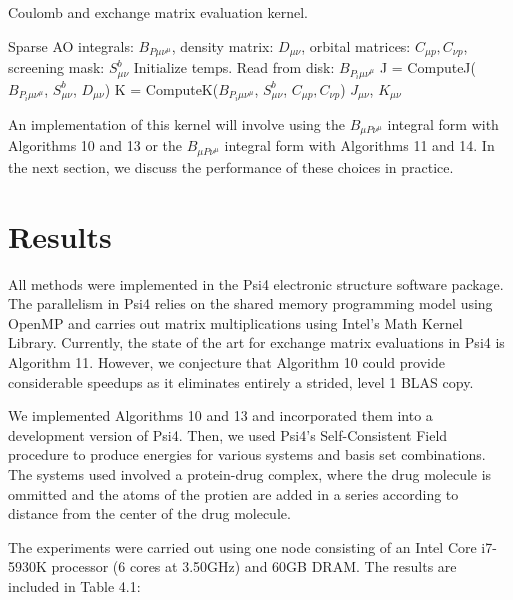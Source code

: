\begin{algorithm}[H]
\caption{Coulomb and exchange matrix evaluation kernel.}
\begin{algorithmic}
\REQUIRE Sparse AO integrals: $B_{P \mu \nu^{\mu}}$, density matrix: $D_{\mu \nu}$, orbital matrices: $C_{\mu p}, C_{\nu p}$, screening mask: $S_{\mu \nu}^b$
\STATE Initialize temps.
    \STATE Read from disk: $B_{P_i \mu \nu^{\mu}}$
    \STATE J = ComputeJ($B_{P_i \mu \nu^{\mu}}$, $S_{\mu \nu}^b$, $D_{\mu \nu}$)
    \STATE K = ComputeK($B_{P_i \mu \nu^{\mu}}$, $S_{\mu \nu}^b$, $C_{\mu p}, C_{\nu p}$)
\ENDFOR
\RETURN $J_{\mu \nu}$, $K_{\mu \nu}$
\end{algorithmic}
\end{algorithm}

\noindent An implementation of this kernel will involve using the $B_{\mu P \nu^\mu}$ integral form with Algorithms 10 and 13 or the 
$B_{\mu P \nu^\mu}$ integral form with Algorithms 11 and 14. In the next section, we discuss the performance of these choices in practice.

\section{Results}

All methods were implemented in the {\sc Psi4} electronic structure software package.
The parallelism in {\sc Psi4} relies on the shared memory programming model using OpenMP 
and carries out matrix multiplications using Intel's Math Kernel
Library. Currently, the state of the art for exchange matrix evaluations in
{\sc Psi4} is Algorithm 11. However, we conjecture that Algorithm 10 could provide 
considerable speedups as it eliminates entirely a strided, level 1 BLAS copy.   

We implemented Algorithms 10 and 13 and incorporated them into a development version of {\sc Psi4}. 
Then, we used {\sc Psi4}'s Self-Consistent Field
procedure to produce energies for various systems and basis set combinations. The systems used involved a protein-drug complex,
where the drug molecule is ommitted and the atoms of the protien are added in a series according to distance from the center of
the drug molecule. 

The experiments were carried out using one node consisting of an Intel Core i7-5930K processor
(6 cores at 3.50GHz) and 60GB DRAM. The results are included in Table 4.1:

